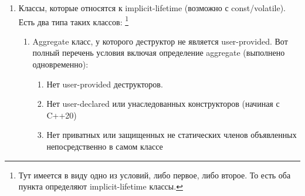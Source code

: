 \documentclass{article}
\begin{document}
\begin{enumerate}
\begin{multicols}{2}
\begin{enumerate}
\item enum-ы
\begin{enumerate}
\item unscoped, то есть \verb"enum".

\item scoped, то есть \verb"enum class".
\end{enumerate}

\item Указатели:
\begin{enumerate}
\item Указатель на объект.

\item Указатель на функцию.
\end{enumerate}

\item Указатель на член класса:
\begin{enumerate}
\item Указатель на данные класса.

\item Указатель на метод класса.
\end{enumerate}

\item \verb"std::nullptr_t".

\item \verb"std::meta::info" (since C++26)
\end{enumerate}
\end{multicols}

\item Классы, которые относятся к implicit-lifetime (возможно с const/volatile).
Есть два типа таких классов:%
\footnote{Тут имеется в виду одно из условий, либо первое, либо второе.
То есть оба пункта определяют implicit-lifetime классы.}
\begin{enumerate}
\item Aggregate класс, у которого деструктор не является user-provided.
Вот полный перечень условия включая определение aggregate (выполнено одновременно):
\begin{enumerate}
\item Нет user-provided деструкторов.

\item Нет user-declared или унаследованных конструкторов (начиная с C++20)

\item Нет приватных или защищенных  не статических членов объявленных непосредственно в самом классе


\end{enumerate}
\end{enumerate}
\end{enumerate}
\end{document}
